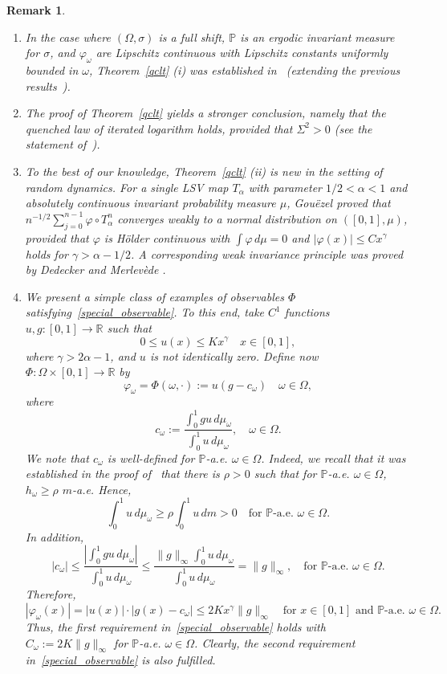 \documentclass[12pt,reqno,a4paper]{article}
\newtheorem{remark}[theorem]{Remark}
\begin{document}
	\begin{remark}\phantom{-}
		\begin{enumerate}
			\item 
			In the case where $(\Omega, \sigma)$ is a full shift, $\mathbb P$ is an ergodic invariant measure for $\sigma$, and $\varphi_\omega$ 
			are Lipschitz continuous with Lipschitz constants uniformly bounded in $\omega$,
			Theorem~\ref{qclt} (i)  was established in~\cite[Corollary 3.8]{Su2} (extending the previous results~\cite{NPT, NTV}).
			\item The proof of Theorem~\ref{qclt} yields a stronger conclusion, namely that the quenched law of iterated logarithm holds, provided that $\Sigma^2>0$ (see the statement of~\cite[Theorem 2.3.]{K}).
			\item To the best of our knowledge, Theorem~\ref{qclt} (ii) is new in the setting of random dynamics.
			For a single LSV map $T_\alpha$ with parameter 
			$1/2 < \alpha < 1$ and absolutely continuous invariant probability measure $\mu$, Gou\"{e}zel \cite{G}
			proved that $n^{-1/2} \sum_{j=0}^{n-1} \varphi \circ T_\alpha^n$ 
			converges weakly to a normal distribution on $([0,1], \mu)$, provided that $\varphi$ is H\"older continuous 
			with $\int \varphi \, d \mu = 0$ and 
			$|\varphi(x)| \le C x^\gamma$ holds for $\gamma > \alpha - 1/2$. A corresponding weak invariance principle was proved by Dedecker 
			and Merlev\`{e}de \cite{DM}.
			\item We present a simple class of examples of observables $\Phi$ satisfying~\eqref{special_observable}. To this end, take $C^1$ functions $u, g\colon [0, 1]\to \mathbb R$ such that 
			\[
			0\le u(x)\le Kx^\gamma \quad x\in [0, 1],
			\]
			where $\gamma>2\alpha-1$, and $u$ is not identically zero.
			Define now $\Phi \colon \Omega \times [0, 1]\to \mathbb R$ by
			\[
			\varphi_\omega=\Phi(\omega, \cdot):=u (g-c_\omega) \quad \omega \in \Omega,
			\]
			where 
			\[
			c_\omega:=\frac{\int_0^1 gu\, d\mu_\omega}{\int_0^1u\, d\mu_\omega}, \quad \omega \in \Omega.
			\]
			We note that $c_\omega$ is well-defined for $\mathbb P$-a.e. $\omega \in \Omega$. Indeed, we recall that it was established in the proof of~\cite[Proposition 9]{DGTS} that there is $\rho>0$ such that for $\mathbb P$-a.e. $\omega \in \Omega$, $h_\omega\ge \rho$ $m$-a.e. Hence, 
			\[
			\int_0^1 u\, d\mu_\omega \ge \rho \int_0^1u\, dm>0 \quad \text{for $\mathbb P$-a.e. $\omega \in \Omega$.}
			\]
			In addition, 
			\[
			|c_\omega|\le \frac{\left |\int_0^1 gu\, d\mu_\omega\right |}{\int_0^1 u\, d\mu_\omega}\le \frac{\|g\|_\infty \int_0^1 u\, d\mu_\omega}{\int_0^1 u\, d\mu_\omega}=\|g\|_\infty, \quad \text{for $\mathbb P$-a.e. $\omega \in \Omega$.}
			\]
			Therefore, 
			\[
			|\varphi_\omega(x)|=|u(x)| \cdot |g(x)-c_\omega|\le 2 Kx^\gamma \|g\|_\infty \quad \text{for $x\in [0, 1]$ and $\mathbb P$-a.e. $\omega \in \Omega$.}
			\]
			Thus, the first requirement in~\eqref{special_observable} holds with $C_\omega:=2K\|g\|_\infty$ for $\mathbb P$-a.e. $\omega \in \Omega$. Clearly, the second requirement in~\eqref{special_observable} is also fulfilled.
		\end{enumerate}
	\end{remark}
	
\end{document}
